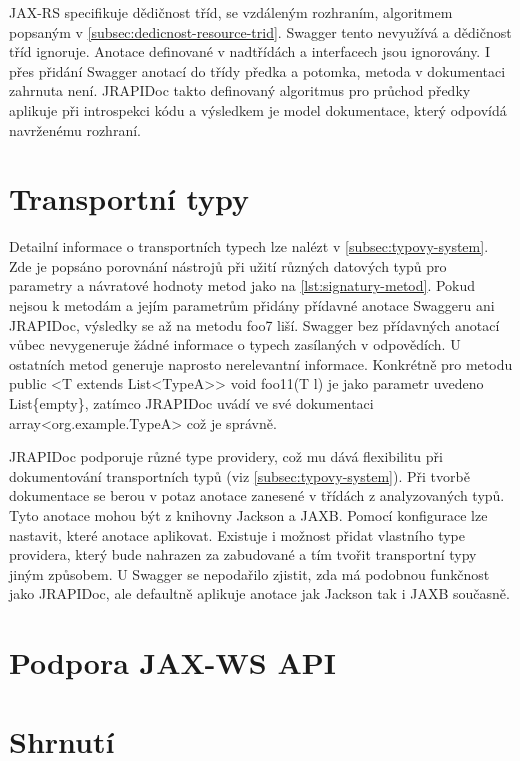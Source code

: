 \documentclass[11pt,twoside,a4paper]{book}
\begin{document}
JAX-RS specifikuje dědičnost tříd, se vzdáleným rozhraním, algoritmem popsaným v
\ref{subsec:dedicnost-resource-trid}. Swagger tento nevyužívá a dědičnost tříd
ignoruje. Anotace definované v nadtřídách a interfacech jsou ignorovány. I přes
přidání Swagger anotací do třídy předka a potomka, metoda v dokumentaci zahrnuta
není. JRAPIDoc takto definovaný algoritmus pro průchod předky aplikuje při
introspekci kódu a výsledkem je model dokumentace, který odpovídá navrženému rozhraní.

\section{Transportní typy}

Detailní informace o transportních typech lze nalézt v
\ref{subsec:typovy-system}.
Zde je popsáno porovnání nástrojů při užití různých datových typů pro
parametry a návratové hodnoty metod jako na \ref{lst:signatury-metod}. Pokud nejsou k
metodám a jejím parametrům přidány přídavné anotace Swaggeru ani JRAPIDoc,
výsledky se až na metodu foo7 liší. Swagger bez přídavných anotací vůbec
nevygeneruje žádné informace o typech zasílaných v odpovědích. U ostatních metod generuje
naprosto nerelevantní informace. Konkrétně pro metodu 
public <T extends List<TypeA>> void foo11(T l) je jako parametr uvedeno
List\{empty\}, zatímco JRAPIDoc uvádí ve své dokumentaci
array<org.example.TypeA> což je správně.

JRAPIDoc podporuje různé type providery, což mu dává flexibilitu při
dokumentování transportních typů (viz \ref{subsec:typovy-system}). Při tvorbě
dokumentace se berou v potaz anotace zanesené v třídách z analyzovaných typů. Tyto anotace mohou být z
knihovny Jackson a JAXB. Pomocí konfigurace lze nastavit, které anotace
aplikovat. Existuje i možnost přidat vlastního type providera, který bude
nahrazen za zabudované a tím tvořit transportní typy jiným způsobem. 
U Swagger se nepodařilo zjistit, zda má podobnou funkčnost jako JRAPIDoc, ale
defaultně aplikuje anotace jak Jackson tak i JAXB současně.






\section{Podpora JAX-WS API}



\section{Shrnutí}
\end{document}
